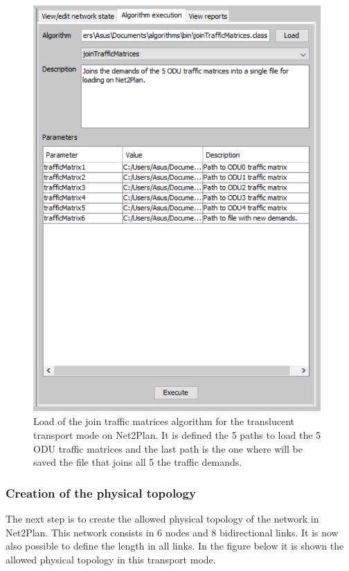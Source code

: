 \begin{figure}[H]
\centering
\includegraphics[width=11cm]{sdf/heuristic/translucent_protection/figures/traffic_matrices}
\caption{Load of the join traffic matrices algorithm for the translucent transport mode on Net2Plan. It is defined the 5 paths to load the 5 ODU traffic matrices and the last path is the one where will be saved the file that joins all 5 the traffic demands.}
\label{traffic_matrices_transl_protec_ref}
\end{figure}

\newpage
\subsubsection{Creation of the physical topology}

\vspace{11pt}
The next step is to create the allowed physical topology of the network in Net2Plan. This network consists in 6 nodes and 8 bidirectional links. It is now also possible to define the length in all links. In the figure below it is shown the allowed physical topology in this transport mode.

